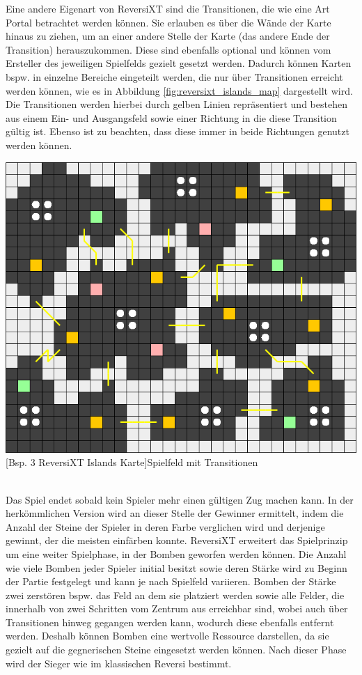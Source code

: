 \documentclass[12pt,a4paper,bibliography=totocnumbered,listof=totocnumbered]{article}
\begin{document}
Eine andere Eigenart von ReversiXT sind die Transitionen, die wie eine Art Portal betrachtet werden können. Sie erlauben es über die Wände der Karte hinaus zu ziehen, um an einer andere Stelle der Karte (das andere Ende der Transition) herauszukommen. Diese sind ebenfalls optional und können vom Ersteller des jeweiligen Spielfelds gezielt gesetzt werden. Dadurch können Karten bspw. in einzelne Bereiche eingeteilt werden, die nur über Transitionen erreicht werden können, wie es in Abbildung \ref{fig:reversixt_islands_map} dargestellt wird. Die Transitionen werden hierbei durch gelben Linien repräsentiert und bestehen aus einem Ein- und Ausgangsfeld sowie einer Richtung in die diese Transition gültig ist. Ebenso ist zu beachten, dass diese immer in beide Richtungen genutzt werden können.

\vspace{1em}
\begin{minipage}{\linewidth}
	\centering
	\includegraphics[width=0.7\linewidth]{pics/reversixt_islands_map.png}
	[Bsp. 3 ReversiXT Islands Karte]{Spielfeld mit Transitionen}
	\label{fig:reversixt_islands_map}
\end{minipage}
\\


Das Spiel endet sobald kein Spieler mehr einen gültigen Zug machen kann. In der herkömmlichen Version wird an dieser Stelle der Gewinner ermittelt, indem die Anzahl der Steine der Spieler in deren Farbe verglichen wird und derjenige gewinnt, der die meisten einfärben konnte. ReversiXT erweitert das Spielprinzip um eine weiter Spielphase, in der Bomben geworfen werden können. Die Anzahl wie viele Bomben jeder Spieler initial besitzt sowie deren Stärke wird zu Beginn der Partie festgelegt und kann je nach Spielfeld variieren. Bomben der Stärke zwei zerstören bspw. das Feld an dem sie platziert werden sowie alle Felder, die innerhalb von zwei Schritten vom Zentrum aus erreichbar sind, wobei auch über Transitionen hinweg gegangen werden kann, wodurch diese ebenfalls entfernt werden. Deshalb können Bomben eine wertvolle Ressource darstellen, da sie gezielt auf die gegnerischen Steine eingesetzt werden können. Nach dieser Phase wird der Sieger wie im klassischen Reversi bestimmt.
\end{document}
